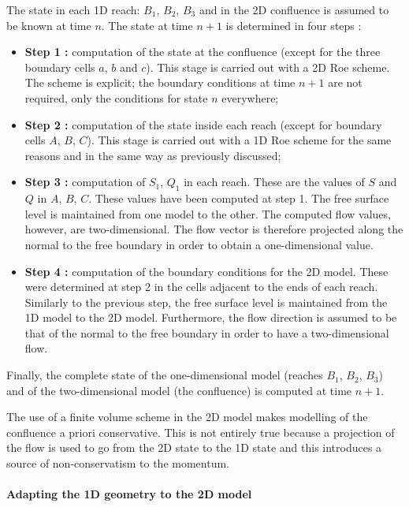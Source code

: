 The state in each 1D reach: $B_1$, $B_2$, $B_3$ and in the 2D confluence is assumed to be known at time $n$. The state at time $n+1$ is determined in four steps :
\begin{itemize}
 \item \textbf{Step 1 :} computation of the state at the confluence (except for the three boundary cells $a$, $b$ and $c$). This stage is carried out with a 2D Roe scheme. The scheme is explicit; the boundary conditions at time $n+1$ are not required, only the conditions for state $n$ everywhere;
 \item \textbf{Step 2 :} computation of the state inside each reach (except for boundary cells $A$, $B$, $C$). This stage is carried out with a 1D Roe scheme for the same reasons and in the same way as previously discussed;
 \item \textbf{Step 3 :} computation of $S_1$, $Q_1$ in each reach. These are the values of $S$ and $Q$ in $A$, $B$, $C$. These values have been computed at step 1. The free surface level is maintained from one model to the other. The computed flow values, however, are two-dimensional. The flow vector is therefore projected along the normal to the free boundary in order to obtain a one-dimensional value.
 \item \textbf{Step 4 :} computation of the boundary conditions for the 2D model. These were determined at step 2 in the cells adjacent to the ends of each reach. Similarly to the previous step, the free surface level is maintained from the 1D model to the 2D model. Furthermore, the flow direction is assumed to be that of the normal to the free boundary in order to have a two-dimensional flow.
\end{itemize}

\vspace{0.5cm}

Finally, the complete state of the one-dimensional model (reaches $B_1$, $B_2$, $B_3$) and of the two-dimensional model (the confluence) is computed at time $n+1$.

\vspace{0.5cm}

The use of a finite volume scheme in the 2D model makes modelling of the confluence a priori conservative. This is not entirely true because a projection of the flow is used to go from the 2D state to the 1D state and this introduces a source of non-conservatism to the momentum.

\paragraph{Adapting the 1D geometry to the 2D model\\}

